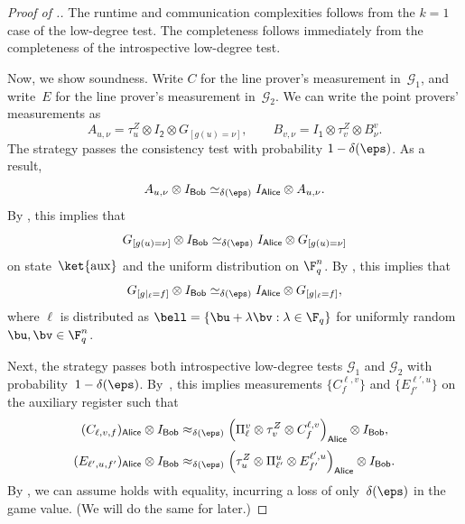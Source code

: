 \documentclass[11pt]{article}
\newcommand{\consistency}{\simeq}
\newcommand{\game}{\mathscr{G}}
\newcommand{\reg}[1]{{\mathsf{#1}}}
\begin{document}
\begin{proof}[Proof of .]
The runtime and communication complexities follows from the $k=1$ case of the low-degree test.
The completeness follows immediately from the completeness of the introspective low-degree test.

Now, we show soundness.
Write $C$ for the line prover's measurement in~$\game_1$,
and write~$E$ for the line prover's measurement in~$\game_2$.
We can write the point provers' measurements as
\begin{equation*}
A_{u, \nu} = \tau_u^Z \otimes I_{\reg{2}} \otimes G_{[g(u)=\nu]},
\qquad B_{v, \nu} = I_{\reg{1}} \otimes \tau_v^Z \otimes B^v_\nu.
\end{equation*}
The strategy passes the consistency test with probability $1-\delta(\eps)$. As a result,
\begin{equation*}
A_{u, \nu} \otimes I_{\reg{Bob}} \consistency_{\delta(\eps)} I_{\reg{Alice}} \otimes A_{u, \nu}.
\end{equation*}
By , this implies that
\begin{equation}\label{eq:to-use-at-the-very-end-when-you-least-expect-it}
G_{[g(u)=\nu]} \otimes I_{\reg{Bob}} \consistency_{\delta(\eps)} I_{\reg{Alice}} \otimes G_{[g(u)=\nu]}
\end{equation}
on state~$\ket{\mathrm{aux}}$ and the uniform distribution on $\F_q^n$.
By , this implies that
\begin{equation}\label{eq:dunno-what-to-name-this-honestly}
G_{[g|_{\ell}=f]} \otimes I_{\reg{Bob}} \consistency_{\delta(\eps)} I_{\reg{Alice}} \otimes G_{[g|_{\ell}=f]},
\end{equation}
where $\ell$ is distributed as $\bell = \{\bu + \lambda \bv : \lambda \in \F_q\}$ for uniformly random $\bu, \bv \in \F_q^n$.

Next, the strategy passes both introspective low-degree tests $\game_1$ and $\game_2$ with probability~$1-\delta(\eps)$.
By~, this implies measurements $\{C^{\ell,v}_f\}$ and $\{E^{\ell', u}_{f'}\}$ on the auxiliary register such that
\begin{equation}\label{eq:doggone-it-one}
(C_{\ell, v, f})_{\reg{Alice}} \otimes I_{\reg{Bob}}
\approx_{\delta(\eps)} \left(\Pi^v_\ell \otimes \tau_v^Z \otimes C^{\ell,v}_f\right)_{\reg{Alice}} \otimes I_{\reg{Bob}},
\end{equation}
\begin{equation}\label{eq:doggone-it-two}
(E_{\ell', u, f'})_{\reg{Alice}} \otimes I_{\reg{Bob}}
\approx_{\delta(\eps)} \left(\tau_u^Z \otimes \Pi_{\ell'}^u \otimes E^{\ell',u}_{f'}\right)_{\reg{Alice}} \otimes I_{\reg{Bob}}.
\end{equation}
By , we can assume  holds with equality, incurring a loss of only~$\delta(\eps)$ in the game value. (We will do the same for  later.)


\end{proof}
\end{document}
